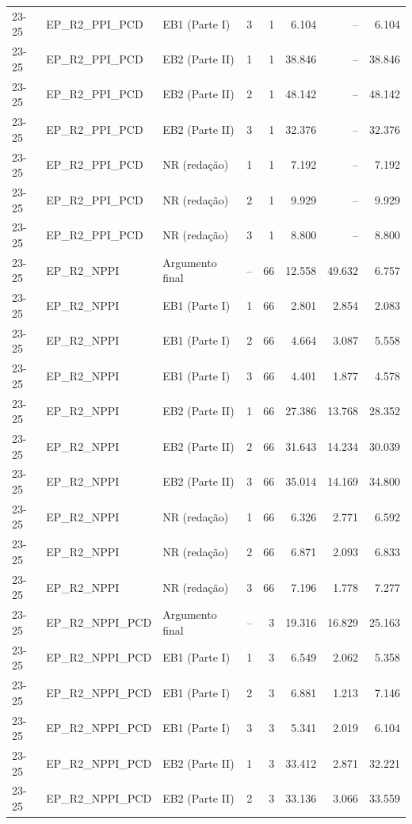 \begin{longtable}{lllcrrrr}
23-25 & EP\_R2\_PPI\_PCD & EB1 (Parte I) & 3 & 1 & 6.104 & -- & 6.104 \\
23-25 & EP\_R2\_PPI\_PCD & EB2 (Parte II) & 1 & 1 & 38.846 & -- & 38.846 \\
23-25 & EP\_R2\_PPI\_PCD & EB2 (Parte II) & 2 & 1 & 48.142 & -- & 48.142 \\
23-25 & EP\_R2\_PPI\_PCD & EB2 (Parte II) & 3 & 1 & 32.376 & -- & 32.376 \\
23-25 & EP\_R2\_PPI\_PCD & NR (redação) & 1 & 1 & 7.192 & -- & 7.192 \\
23-25 & EP\_R2\_PPI\_PCD & NR (redação) & 2 & 1 & 9.929 & -- & 9.929 \\
23-25 & EP\_R2\_PPI\_PCD & NR (redação) & 3 & 1 & 8.800 & -- & 8.800 \\
23-25 & EP\_R2\_NPPI & Argumento final & -- & 66 & 12.558 & 49.632 & 6.757 \\
23-25 & EP\_R2\_NPPI & EB1 (Parte I) & 1 & 66 & 2.801 & 2.854 & 2.083 \\
23-25 & EP\_R2\_NPPI & EB1 (Parte I) & 2 & 66 & 4.664 & 3.087 & 5.558 \\
23-25 & EP\_R2\_NPPI & EB1 (Parte I) & 3 & 66 & 4.401 & 1.877 & 4.578 \\
23-25 & EP\_R2\_NPPI & EB2 (Parte II) & 1 & 66 & 27.386 & 13.768 & 28.352 \\
23-25 & EP\_R2\_NPPI & EB2 (Parte II) & 2 & 66 & 31.643 & 14.234 & 30.039 \\
23-25 & EP\_R2\_NPPI & EB2 (Parte II) & 3 & 66 & 35.014 & 14.169 & 34.800 \\
23-25 & EP\_R2\_NPPI & NR (redação) & 1 & 66 & 6.326 & 2.771 & 6.592 \\
23-25 & EP\_R2\_NPPI & NR (redação) & 2 & 66 & 6.871 & 2.093 & 6.833 \\
23-25 & EP\_R2\_NPPI & NR (redação) & 3 & 66 & 7.196 & 1.778 & 7.277 \\
23-25 & EP\_R2\_NPPI\_PCD & Argumento final & -- & 3 & 19.316 & 16.829 & 25.163 \\
23-25 & EP\_R2\_NPPI\_PCD & EB1 (Parte I) & 1 & 3 & 6.549 & 2.062 & 5.358 \\
23-25 & EP\_R2\_NPPI\_PCD & EB1 (Parte I) & 2 & 3 & 6.881 & 1.213 & 7.146 \\
23-25 & EP\_R2\_NPPI\_PCD & EB1 (Parte I) & 3 & 3 & 5.341 & 2.019 & 6.104 \\
23-25 & EP\_R2\_NPPI\_PCD & EB2 (Parte II) & 1 & 3 & 33.412 & 2.871 & 32.221 \\
23-25 & EP\_R2\_NPPI\_PCD & EB2 (Parte II) & 2 & 3 & 33.136 & 3.066 & 33.559 \\

\end{longtable}

